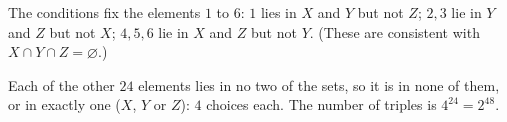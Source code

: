 The conditions fix the elements $1$ to $6$: $1$ lies in $X$ and $Y$ but not $Z$; $2,3$ lie in $Y$ and $Z$ but not $X$; $4,5,6$ lie in $X$ and $Z$ but not $Y$. (These are consistent with $X\cap Y\cap Z=\varnothing$.)

Each of the other $24$ elements lies in no two of the sets, so it is in none of them, or in exactly one ($X$, $Y$ or $Z$): $4$ choices each. The number of triples is $4^{24}=\boxed{2^{48}}$.
